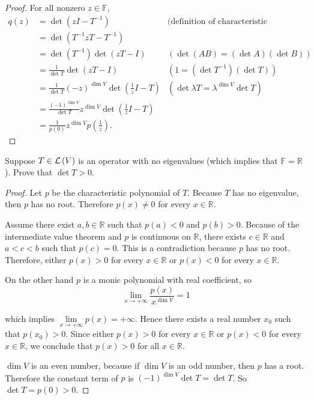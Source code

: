 \begin{proof}
    For all nonzero $z\in\mathbb{F}$,
    \begin{align*}
        q(z) & = \det(zI - T^{-1})                                                         & \text{(definition of characteristic polynomial)} \\
             & = \det(T^{-1}zT - T^{-1})                                                                                                      \\
             & = \det(T^{-1})\det(zT - I)                                                  & (\det(AB) = (\det A)(\det B))                    \\
             & = \frac{1}{\det T}\det(zT - I)                                              & (1 = (\det T^{-1})(\det T))                      \\
             & = \frac{1}{\det T}{(-z)}^{\dim V}\det\left(\frac{1}{z}I - T\right)          & (\det\lambda T = \lambda^{\dim V}\det T)         \\
             & = \frac{{(-1)}^{\dim V}}{\det T}z^{\dim V}\det\left(\frac{1}{z}I - T\right)                                                    \\
             & = \frac{1}{p(0)}z^{\dim V}p\left(\frac{1}{z}\right).
    \end{align*}
\end{proof}
\newpage

\begin{exercise}\label{chapter9:sectionC:exercise8}
    Suppose $T \in \mathcal{L}\left({V}\right)$ is an operator with no eigenvalues (which implies that $\mathbb{F} = \mathbb{R}$). Prove that $\det T > 0$.
\end{exercise}

\begin{proof}
    Let $p$ be the characteristic polynomial of $T$. Because $T$ has no eigenvalue, then $p$ has no root. Therefore $p(x)\ne 0$ for every $x\in\mathbb{R}$.

    Assume there exist $a, b\in\mathbb{R}$ such that $p(a) < 0$ and $p(b) > 0$. Because of the intermediate value theorem and $p$ is continuous on $\mathbb{R}$, there exists $c\in\mathbb{R}$ and $a < c < b$ such that $p(c) = 0$. This is a contradiction because $p$ has no root. Therefore, either $p(x) > 0$ for every $x\in\mathbb{R}$ or $p(x) < 0$ for every $x\in\mathbb{R}$.

    On the other hand $p$ is a monic polynomial with real coefficient, so
    \[
        \lim\limits_{x\to+\infty}\frac{p(x)}{x^{\dim V}} = 1
    \]

    which implies $\lim\limits_{x\to+\infty}p(x) = +\infty$. Hence there exists a real number $x_{0}$ such that $p(x_{0}) > 0$. Since either $p(x) > 0$ for every $x\in\mathbb{R}$ or $p(x) < 0$ for every $x\in\mathbb{R}$, we conclude that $p(x) > 0$ for all $x\in\mathbb{R}$.

    $\dim V$ is an even number, because if $\dim V$ is an odd number, then $p$ has a root. Therefore the constant term of $p$ is ${(-1)}^{\dim V}\det T = \det T$. So $\det T = p(0) > 0$.
\end{proof}
\newpage

